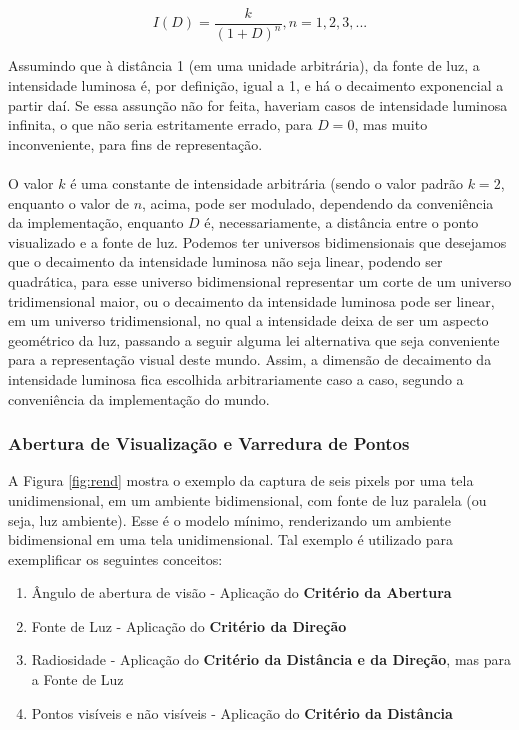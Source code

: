 \documentclass{article}
\begin{document}
	\begin{equation} \label{eq:1}
	 I(D) = \frac{k}{(1+D)^n}, n = 1,2,3, ... 
	\end{equation}

	Assumindo que à distância 1 (em uma unidade arbitrária), da fonte de luz, a intensidade luminosa é, por definição, igual a 1, e há o decaimento exponencial a partir daí. Se essa assunção não for feita, haveriam casos de intensidade luminosa infinita, o que não seria estritamente errado, para $D = 0$, mas muito inconveniente, para fins de representação.
	
	\paragraph{}	
	O valor $k$ é uma constante de intensidade arbitrária (sendo o valor padrão $k=2$, enquanto o valor de $n$, acima, pode ser modulado, dependendo da conveniência da implementação, enquanto $D$ é, necessariamente, a distância entre o ponto visualizado e a fonte de luz. Podemos ter universos bidimensionais que desejamos que o decaimento da intensidade luminosa não seja linear, podendo ser quadrática, para esse universo bidimensional representar um corte de um universo tridimensional maior, ou o decaimento da intensidade luminosa pode ser linear, em um universo tridimensional, no qual a intensidade deixa de ser um aspecto geométrico da luz, passando a seguir alguma lei alternativa que seja conveniente para a representação visual deste mundo. Assim, a dimensão de decaimento da intensidade luminosa fica escolhida arbitrariamente caso a caso, segundo a conveniência da implementação do mundo.
	
	\subsubsection{Abertura de Visualização e Varredura de Pontos} \label{varredura-1}
	
	A Figura \ref{fig:rend} mostra o exemplo da captura de seis pixels por uma tela unidimensional, em um ambiente bidimensional, com fonte de luz paralela (ou seja, luz ambiente). Esse é o modelo mínimo, renderizando um ambiente bidimensional em uma tela unidimensional. Tal exemplo é utilizado para exemplificar os seguintes conceitos:
	
	\begin{enumerate}
		\item Ângulo de abertura de visão - Aplicação do \textbf{Critério da Abertura}
		\item Fonte de Luz - Aplicação do \textbf{Critério da Direção}
		\item Radiosidade - Aplicação do \textbf{Critério da Distância e da Direção}, mas para a Fonte de Luz
		\item Pontos visíveis e não visíveis - Aplicação do \textbf{Critério da Distância}
	\end{enumerate}
	
\end{document}
